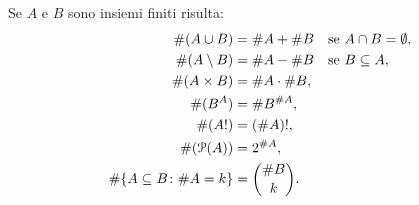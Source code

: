 \begin{theorem}
  \label{th:combinatoria}
  Se $A$ e $B$ sono insiemi finiti risulta:
  \begin{align}
    \#(A\cup B) &= \#A + \#B \quad \text{se $A\cap B=\emptyset$},\\
    \#(A\setminus B) &= \#A - \#B \quad \text{se $B\subseteq A$},\\
    \#(A\times B) &= \#A \cdot \#B, \\
    \#(B^A) &= \#B^{\#A}, \\
    \#(A!) &= (\#A)!, \\
    \#(\mathcal P(A)) &= 2^{\#A}, \\
    \#{\left\{ A\subseteq B \colon \#A=k \right\}} &= \binom{\#B}{k}.
  \end{align}
\end{theorem}
